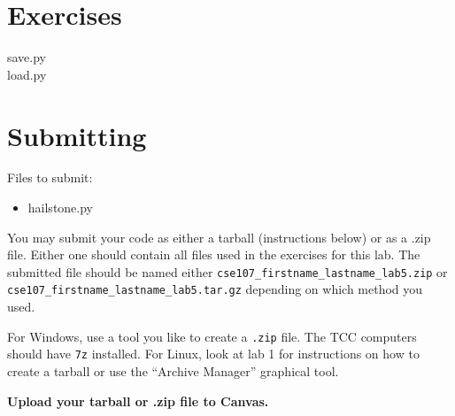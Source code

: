 \documentclass[11pt]{cselabheader}
\begin{document}


\section{Exercises}
\label{sec:ex}

\begin{description}
  \item[save.py]
  \item[load.py]
\end{description}

\section{Submitting}

Files to submit:
\begin{itemize}
  \item hailstone.py
\end{itemize}

You may submit your code as either a tarball (instructions below) or as a .zip
file. Either one should contain all files used in the exercises for this lab.
The submitted file should be named either
\texttt{cse107\_firstname\_lastname\_lab5.zip} or
\texttt{cse107\_firstname\_lastname\_lab5.tar.gz} depending on which method you
used.

For Windows, use a tool you like to create a \texttt{.zip} file. The TCC
computers should have \texttt{7z} installed. For Linux, look at lab 1 for
instructions on how to create a tarball or use the ``Archive Manager'' graphical
tool.

\begin{center}
  \textbf{Upload your tarball or .zip file to Canvas.}
\end{center}
\end{document}
